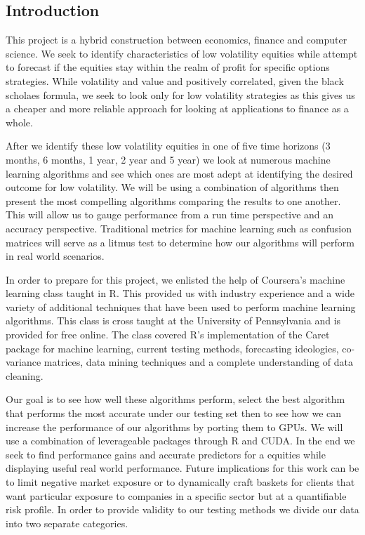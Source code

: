\documentclass[paper=letter, fontsize=11pt]{scrartcl}
\numberwithin{equation}{section}		%
\numberwithin{figure}{section}			%
\numberwithin{table}{section}				%
\begin{document}
\begin{spacing}{2}
\section{Introduction}
This project is a hybrid construction between economics, finance and computer science. We seek to identify characteristics of low volatility equities while attempt to forecast if the equities stay within the realm of profit for specific options strategies. While volatility and value and positively correlated, given the black scholaes formula, we seek to look only for low volatility strategies as this gives us a cheaper and more reliable approach for looking at applications to finance as a whole.

After we identify these low volatility equities in one of five time horizons (3 months, 6 months, 1 year, 2 year and 5 year) we look at numerous machine learning algorithms and see which ones are most adept at identifying the desired outcome for low volatility. We will be using a combination of algorithms then present the most compelling algorithms comparing the results to one another. This will allow us to gauge performance from a run time perspective and an accuracy perspective. Traditional metrics for machine learning such as confusion matrices will serve as a litmus test to determine how our algorithms will perform in real world scenarios. 

In order to prepare for this project, we enlisted the help of Coursera's machine learning class taught in R. This provided us with industry experience and a wide variety of additional techniques that have been used to perform machine learning algorithms. This class is cross taught at the University of Pennsylvania and is provided for free online. The class covered R's implementation of the Caret package for machine learning, current testing methods, forecasting ideologies, co-variance matrices, data mining techniques and a complete understanding of data cleaning. 

Our goal is to see how well these algorithms perform, select the best algorithm that performs the most accurate under our testing set then to see how we can increase the performance of our algorithms by porting them to GPUs. We will use a combination of leverageable packages through R and CUDA. In the end we seek to find performance gains and accurate predictors for a equities while displaying useful real world performance. Future implications for this work can be to limit negative market exposure or to dynamically craft baskets for clients that want particular exposure to companies in a specific sector but at a quantifiable risk profile. In order to provide validity to our testing methods we divide our data into two separate categories. 

\end{spacing}
\end{document}

